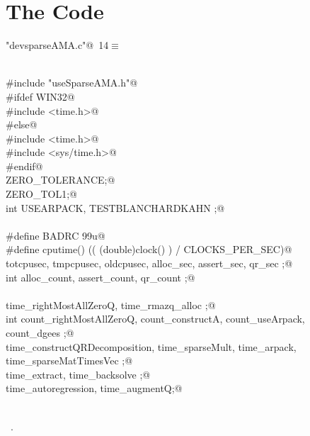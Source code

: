 \documentclass[12pt]{article}
\begin{document}
\section{The Code}
\begin{flushleft} \small
\begin{minipage}{\linewidth}\label{scrap2}\raggedright\small
{} \verb@"devsparseAMA.c"@\nobreak\ {\footnotesize {14}}$\equiv$
\vspace{-1ex}
\begin{list}{}{} \item
\mbox{}\verb@@\\
\mbox{}\verb@#include "useSparseAMA.h"@\\
\mbox{}\verb@#ifdef WIN32@\\
\mbox{}\verb@#include <time.h>@\\
\mbox{}\verb@#else@\\
\mbox{}\verb@#include <time.h>@\\
\mbox{}\verb@#include <sys/time.h>@\\
\mbox{}\verb@#endif@\\
\mbox{}\verb@double ZERO_TOLERANCE;@\\
\mbox{}\verb@double ZERO_TOL1;@\\
\mbox{}\verb@unsigned int USEARPACK, TESTBLANCHARDKAHN ;@\\
\mbox{}\verb@@\\
\mbox{}\verb@#define BADRC 99u@\\
\mbox{}\verb@#define cputime() (( (double)clock() ) / CLOCKS_PER_SEC)@\\
\mbox{}\verb@double totcpusec, tmpcpusec, oldcpusec, alloc_sec, assert_sec, qr_sec ;@\\
\mbox{}\verb@unsigned int  alloc_count, assert_count, qr_count ;@\\
\mbox{}\verb@@\\
\mbox{}\verb@double time_rightMostAllZeroQ, time_rmazq_alloc ;@\\
\mbox{}\verb@unsigned int count_rightMostAllZeroQ, count_constructA, count_useArpack, count_dgees ;@\\
\mbox{}\verb@double time_constructQRDecomposition, time_sparseMult, time_arpack, time_sparseMatTimesVec ;@\\
\mbox{}\verb@double time_extract, time_backsolve ;@\\
\mbox{}\verb@double time_autoregression, time_augmentQ;@\\
\mbox{}\verb@@\\
\mbox{}\verb@@{\NWsep}
\end{list}
\vspace{-1.5ex}
\footnotesize
\begin{list}{}{\setlength{\itemsep}{-\parsep}\setlength{\itemindent}{-\leftmargin}}
\item \NWtxtFileDefBy\ .

\item{}
\end{list}
\end{minipage}\vspace{4ex}
\end{flushleft}
\end{document}
